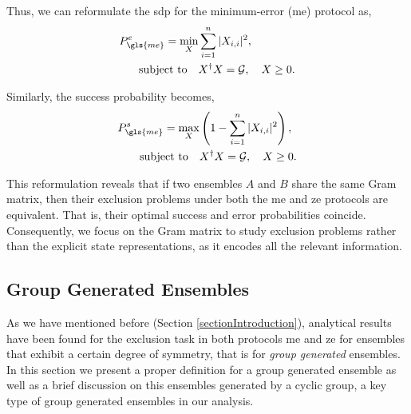 \documentclass[12pt,letterpaper]{article}
\begin{document}
Thus, we can reformulate the \gls{sdp} for the minimum-error (\gls{me}) protocol as,
\begin{align*}
	P_{\gls{me}}^e = \min_{X} &\sum_{i=1}^n |X_{i,i}|^2, \\
	\text{subject to} \quad & X^\dagger X = \mathcal{G}, \quad X \geq 0.
\end{align*}

Similarly, the success probability becomes,
\begin{align*}
	P_{\gls{me}}^s = \max_{X} &\left( 1 - \sum_{i=1}^n |X_{i,i}|^2 \right), \\
	\text{subject to} \quad & X^\dagger X = \mathcal{G}, \quad X \geq 0.
\end{align*}

This reformulation reveals that if two ensembles $A$ and $B$ share the same Gram matrix, then their exclusion problems under both the \gls{me} and \gls{ze} protocols are equivalent. That is, their optimal success and error probabilities coincide. Consequently, we focus on the Gram matrix to study exclusion problems rather than the explicit state representations, as it encodes all the relevant information.


\subsection{Group Generated Ensembles}\label{sectionGroupGeneratedEnsemble}

\hspace{20pt}As we have mentioned before (Section \ref{sectionIntroduction}), analytical results have been found for the exclusion task in both protocols \gls{me} and \gls{ze} for ensembles that exhibit a certain degree of symmetry\cite{MainPaper}, that is for \emph{group generated} ensembles. In this section we present a proper definition for a group generated ensemble as well as a brief discussion on this ensembles generated by a cyclic group, a key type of group generated ensembles in our analysis.
\end{document}
